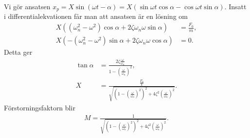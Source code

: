 Vi gör ansatsen $x_p = X\sin{(\omega t - \alpha)} = X(\sin{\omega t}\cos{\alpha} - \cos{\omega t}\sin{\alpha})$. Insatt i differentialekvationen får man att ansatsen är en lösning om
\begin{align*}
	X\left((\omega_n^2 - \omega^2)\cos{\alpha} + 2\zeta\omega_n\omega\sin{\alpha}\right) &= \frac{F_0}{m}, \\
	X\left(-(\omega_n^2 - \omega^2)\sin{\alpha} + 2\zeta\omega_n\omega\cos{\alpha}\right) &= 0.
\end{align*}
Detta ger
\begin{align*}
	\tan{\alpha} &= \frac{2\zeta\frac{\omega}{\omega_n}}{1 - \left(\frac{\omega}{\omega_n}\right)^2}, \\
	X            &= \frac{\frac{F_0}{k}}{\sqrt{\left(1 - \left(\frac{\omega}{\omega_n}\right)^2\right)^2 + 4\zeta^2\left(\frac{\omega}{\omega_n}\right)^2}}.
\end{align*}
Förstorningsfaktorn blir
\begin{align*}
	M = \frac{1}{\sqrt{\left(1 - \left(\frac{\omega}{\omega_n}\right)^2\right)^2 + 4\zeta^2\left(\frac{\omega}{\omega_n}\right)^2}}.
\end{align*}